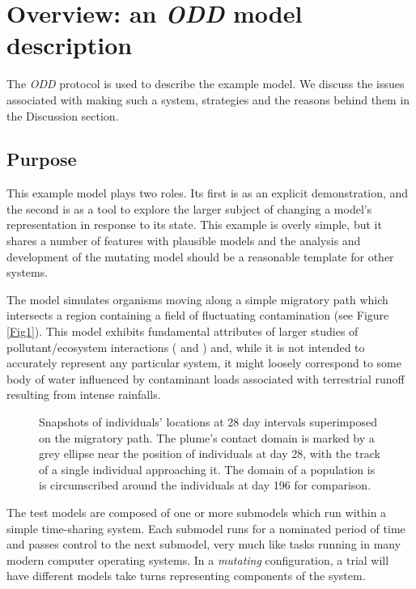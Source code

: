 \section{Overview: an {\em{ODD}} model description}\label{ODD}

The {\em{ODD}} protocol \citep{Grimm06:1} is used to describe the example
model. We discuss the issues associated with making such a system, strategies
and the reasons behind them in the Discussion section.

\subsection{Purpose}

This example model plays two roles. Its first is as an explicit demonstration,
and the second is as a tool to explore the larger subject of changing a
model's representation in response to its state. This example is overly
simple, but it shares a number of features with plausible models and the
analysis and development of the mutating model should be a reasonable template
for other systems.

The model simulates organisms moving along a simple migratory path which
intersects a region containing a field of fluctuating contamination (see
Figure \ref{Fig1}). This model exhibits fundamental attributes of larger
studies of pollutant/ecosystem interactions (\citeauthor{Lyne94:1} and
\citeauthor{Gray06:1}) and, while it is not intended to accurately represent any
particular system, it might loosely correspond to some body of water
influenced by contaminant loads associated with terrestrial runoff resulting
from intense rainfalls.

\begin{figure}[h]
  
  \caption{Snapshots of individuals' locations at 28 day intervals
  superimposed on the migratory path. The plume's contact domain is marked by
  a grey ellipse near the position of individuals at day 28, with the track of
  a single individual approaching it. The domain of a population is is
  circumscribed around the individuals at day 196 for comparison.}
\end{figure}\label{Fig1}



The test models are composed of one or more submodels which run within a
simple time-sharing system. Each submodel runs for a nominated period of time
and passes control to the next submodel, very much like tasks running in many
modern computer operating systems. In a {\em{mutating}} configuration, a
trial will have different models take turns representing components of the
system.

